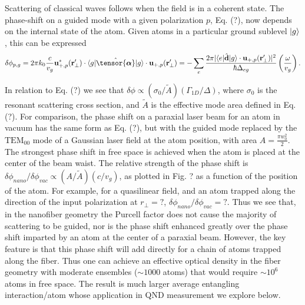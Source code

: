 \documentclass[preprint,aps,pra,onecolumn]{revtex4-1} %
\begin{document}
Scattering of classical waves follows when the field is in a coherent state.  The phase-shift on a guided 
mode with a given polarization $p$, Eq. (?), now depends on the internal state of the atom.  Given atoms 
in a particular ground sublevel $\lvert{g}\rangle$, this can be expressed
\begin{equation}
\delta  \phi_{p,g} =2\pi k_0 \frac{c}{v_g}\mathbf{u}^*_{+, p}(\br'_\perp) \cdot \bra{g} 
\hat{\tensor{\boldsymbol{\alpha}}} \ket{g} \cdot \mathbf{u}_{+, p}(\br'_\perp) = -\sum_e \frac{2 \pi 
|\bra{e}\hat{\mathbf{d}}\ket{g} \cdot \mathbf{u}_{+,p}(\br'_\perp)|^2}{\hbar \Delta_{eg}} 
\left(\frac{\omega}{v_g}\right).
\end{equation}

In relation to Eq. (?) we see that $\delta \phi \propto (\sigma_0/\tilde{A}) (\Gamma_{1D}/\Delta)$, where 
$\sigma_0$ is the resonant scattering cross section, and $\tilde{A}$ is the effective mode area defined in 
Eq. (?).  For comparison, the phase shift on a paraxial laser beam for an atom in vacuum has the same 
form as Eq. (?), but with the guided mode replaced by the  $\mathrm{TEM}_{00}$ mode of a Gaussian 
laser field at the atom position, with area $A=\frac{\pi w_0^2}{2}$. The strongest phase shift in free 
space is achieved when the atom is placed at the center of the beam waist.   The relative strength of the 
phase shift is $\delta \phi_{nano}/\delta \phi_{vac}\propto (A/\tilde{A}) (c/v_g)$, as plotted in Fig. ? as a 
function of the position of the atom.  For example, for a quasilinear field, and an atom trapped along the 
direction of the input polarization  at $r_\perp = ?$, $\delta \phi_{nano}/\delta \phi_{vac} = ?$.   Thus we 
see that, in the nanofiber geometry the Purcell factor does not cause the majority of scattering to be 
guided, nor is the phase shift enhanced greatly over the phase shift imparted by an atom at the center of 
a paraxial beam.  However, the key feature is that this phase shift will add directly for a chain of atoms 
trapped along the fiber.  Thus one can achieve an effective optical density in the fiber geometry with 
moderate ensembles ($\sim 1000$ atoms) that would require $\sim 10^6$ atoms in free space.  The 
result is much larger average entangling interaction/atom whose application in QND measurement we 
explore below.

\end{document}
